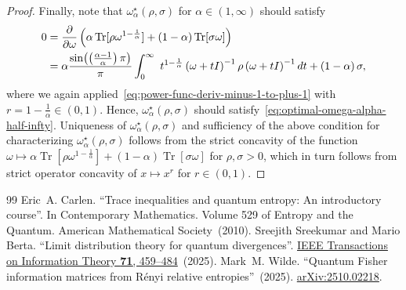 \documentclass[10pt,a4paper]{amsart}
\DeclareMathOperator{\Tr}{Tr}
\begin{document}
\begin{proof}
Finally, note that $\omega_{\alpha}^{\star}(\rho,\sigma)$ for $\alpha \in (1,\infty)$ should satisfy 
\begin{align}
 0&= \frac{\partial}{\partial\omega}\left(\alpha\Tr[\rho\omega^{1-\frac{1}{\alpha}}]+\left(1-\alpha\right)\Tr[\sigma\omega]\right)\nonumber \\
  & =\alpha\frac{\sin\!\left(\left(\frac{\alpha-1}{\alpha}\right)\pi\right)}{\pi}\int_{0}^{\infty}\ t^{1-\frac{1}{\alpha}}\left(\omega+tI\right)^{-1}\rho\left(\omega+tI\right)^{-1}dt+\left(1-\alpha\right)\sigma, \notag
\end{align}
where we again applied~\eqref{eq:power-func-deriv-minus-1-to-plus-1} with $r=1-\frac{1}{\alpha}\in\left(0,1\right)$. Hence, 
 $\omega_{\alpha}^{\star}(\rho,\sigma)$ should satisfy~\eqref{eq:optimal-omega-alpha-half-infty}. 
Uniqueness of  $\omega_{\alpha}^{\star}(\rho,\sigma)$ and sufficiency of the above condition for characterizing $\omega_{\alpha}^{\star}(\rho,\sigma)$ follows from the strict concavity of the
function $\omega\mapsto\alpha\Tr[\rho\omega^{1-\frac{1}{\alpha}}]+\left(1-\alpha\right)\Tr[\sigma\omega]$
for $\rho,\sigma>0$, which in turn follows from strict operator concavity of  $x \mapsto  x^r$ for $r \in (0,1)$. 
\end{proof}

\begin{thebibliography}{99}
 Eric~A. Carlen. \newblock ``Trace inequalities and quantum entropy: An introductory course''. \newblock In Contemporary Mathematics. \newblock Volume 529 of Entropy and the Quantum. \newblock American Mathematical Society~(2010).
 Sreejith Sreekumar and Mario Berta. \newblock ``Limit distribution theory for quantum divergences''. \newblock \href{https://dx.doi.org/10.1109/TIT.2024.3482168}{IEEE Transactions on Information Theory {\bf 71}, 459--484}~(2025).
 Mark~M. Wilde. \newblock ``{Quantum Fisher information matrices from R\'enyi relative entropies}''~(2025). \newblock \href{http://arxiv.org/abs/2510.02218}{arXiv:2510.02218}.
\end{thebibliography}
\end{document}
